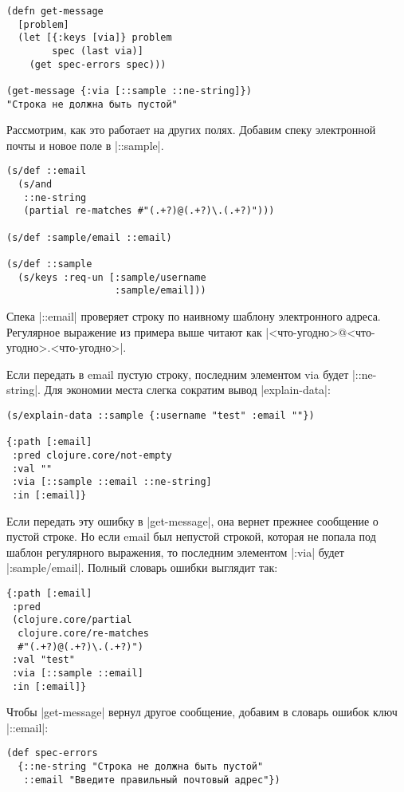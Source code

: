 \begin{verbatim}
(defn get-message
  [problem]
  (let [{:keys [via]} problem
        spec (last via)]
    (get spec-errors spec)))

(get-message {:via [::sample ::ne-string]})
"Строка не должна быть пустой"
\end{verbatim}

Рассмотрим, как это работает на других полях. Добавим спеку электронной почты и
новое поле в \spverb|::sample|.

\begin{verbatim}
(s/def ::email
  (s/and
   ::ne-string
   (partial re-matches #"(.+?)@(.+?)\.(.+?)")))

(s/def :sample/email ::email)

(s/def ::sample
  (s/keys :req-un [:sample/username
                   :sample/email]))
\end{verbatim}

Спека \spverb|::email| проверяет строку по наивному шаблону электронного
адреса. Регулярное выражение из примера выше читают как
\spverb|<что-угодно>@<что-угодно>.<что-угодно>|.

Если передать в email пустую строку, последним элементом via будет
\spverb|::ne-string|. Для экономии места слегка сократим вывод \spverb|explain-data|:

\begin{verbatim}
(s/explain-data ::sample {:username "test" :email ""})

{:path [:email]
 :pred clojure.core/not-empty
 :val ""
 :via [::sample ::email ::ne-string]
 :in [:email]}
\end{verbatim}

Если передать эту ошибку в \spverb|get-message|, она вернет прежнее сообщение о пустой
строке. Но если email был непустой строкой, которая не попала под шаблон
регулярного выражения, то последним элементом \spverb|:via| будет
\spverb|:sample/email|. Полный словарь ошибки выглядит так:

\begin{verbatim}
{:path [:email]
 :pred
 (clojure.core/partial
  clojure.core/re-matches
  #"(.+?)@(.+?)\.(.+?)")
 :val "test"
 :via [::sample ::email]
 :in [:email]}
\end{verbatim}

Чтобы \spverb|get-message| вернул другое сообщение, добавим в словарь ошибок ключ
\spverb|::email|:

\begin{verbatim}
(def spec-errors
  {::ne-string "Строка не должна быть пустой"
   ::email "Введите правильный почтовый адрес"})
\end{verbatim}

